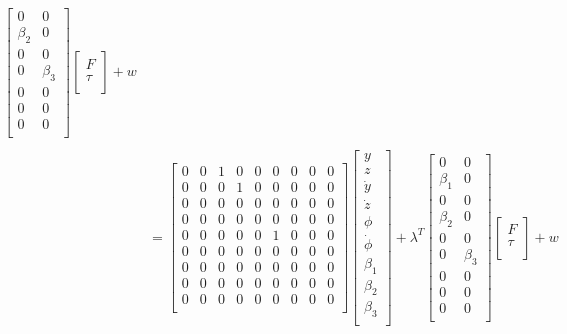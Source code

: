 \documentclass[12pt]{article}
\begin{document}
\begin{align*}
\begin{bmatrix}
        0 & 0 \\
        \beta_2 & 0 \\
        0 & 0 \\
        0 & \beta_3 \\
        0 & 0 \\
        0 & 0 \\
        0 & 0 \\
    \end{bmatrix}
    \begin{bmatrix}
        F \\
        \tau \\
    \end{bmatrix} + w\\ \\
    &= 
    \begin{bmatrix}
        0 & 0 & 1 & 0 & 0 & 0 & 0 & 0 & 0 \\
        0 & 0 & 0 & 1 & 0 & 0 & 0 & 0 & 0 \\
        0 & 0 & 0 & 0 & 0 & 0 & 0 & 0 & 0 \\
        0 & 0 & 0 & 0 & 0 & 0 & 0 & 0 & 0 \\
        0 & 0 & 0 & 0 & 0 & 1 & 0 & 0 & 0 \\
        0 & 0 & 0 & 0 & 0 & 0 & 0 & 0 & 0 \\
        0 & 0 & 0 & 0 & 0 & 0 & 0 & 0 & 0 \\
        0 & 0 & 0 & 0 & 0 & 0 & 0 & 0 & 0 \\
        0 & 0 & 0 & 0 & 0 & 0 & 0 & 0 & 0 \\
    \end{bmatrix}
    \begin{bmatrix}
        y \\
        z \\
        \dot{y} \\
        \dot{z} \\
        \phi \\
        \dot{\phi} \\
        \beta_1 \\
        \beta_2 \\
        \beta_3 \\
    \end{bmatrix} +
    \lambda^T 
    \begin{bmatrix}
        0 & 0 \\
        \beta_1 & 0 \\
        0 & 0 \\
        \beta_2 & 0 \\
        0 & 0 \\
        0 & \beta_3 \\
        0 & 0 \\
        0 & 0 \\
        0 & 0 \\
    \end{bmatrix}
    \begin{bmatrix}
        F \\
        \tau \\
    \end{bmatrix} + w\\
\end{align*}
\end{document}
